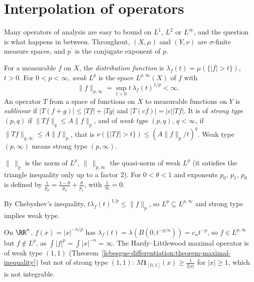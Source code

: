 \section{Interpolation of operators}\label{harmonic-analysis:section-interpolation}

Many operators of analysis are easy to bound on $L^1$, $L^2$ or $L^\infty$, and the question is what happens in between. Throughout, $(X, \mu)$ and $(Y, \nu)$ are $\sigma$-finite measure spaces, and $p^{\prime}$ is the
conjugate exponent of $p$.

\begin{definition}\label{harmonic-analysis:definition-weak-lp}
For a measurable $f$ on $X$, the \emph{distribution function} is $\lambda_f(t) = \mu(\{|f| > t\})$, $t > 0$. For $0 < p < \infty$, \emph{weak $L^p$} is the space $L^{p,\infty}(X)$ of $f$ with
\[
\|f\|_{p,\infty} = \sup_{t > 0}t\,\lambda_f(t)^{1/p} < \infty.
\]
An operator $T$ from a space of functions on $X$ to measurable functions on $Y$ is \emph{sublinear} if $|T(f + g)| \leq |Tf| + |Tg|$ and $|T(cf)| = |c||Tf|$. It is of \emph{strong type} $(p, q)$ if
$\|Tf\|_q \leq A\|f\|_p$, and of \emph{weak type} $(p, q)$, $q < \infty$, if $\|Tf\|_{q,\infty} \leq A\|f\|_p$, that is $\nu(\{|Tf| > t\}) \leq (A\|f\|_p/t)^q$. Weak type $(p, \infty)$ means strong type $(p, \infty)$.
\end{definition}

\begin{notation}\label{harmonic-analysis:notation-interpolation}
$\|\ \|_p$ is the norm of $L^p$, $\|\ \|_{p,\infty}$ the quasi-norm of weak $L^p$ (it satisfies the triangle inequality only up to a factor $2$). For $0 < \theta < 1$ and exponents $p_0$, $p_1$, $p_\theta$ is defined by
$\frac{1}{p_\theta} = \frac{1 - \theta}{p_0} + \frac{\theta}{p_1}$, with $\frac1\infty = 0$.
\end{notation}

By Chebyshev's inequality, $t\lambda_f(t)^{1/p} \leq \|f\|_p$, so $L^p \subseteq L^{p,\infty}$ and strong type implies weak type.

\begin{example}\label{harmonic-analysis:example-weak-lp}
On $\RR^n$, $f(x) = |x|^{-n/p}$ has $\lambda_f(t) = \lambda(B(0, t^{-p/n})) = c_nt^{-p}$, so $f \in L^{p,\infty}$ but $f \notin L^p$, as $\int|f|^p = \int|x|^{-n} = \infty$. The Hardy--Littlewood maximal operator is of weak
type $(1, 1)$ (Theorem~\ref{lebesgue-differentiation:theorem-maximal-inequality}) but not of strong type $(1, 1)$: $M\mathbf{1}_{[0,1]}(x) \geq \frac{1}{2|x|}$ for $|x| \geq 1$, which is not integrable.
\end{example}

